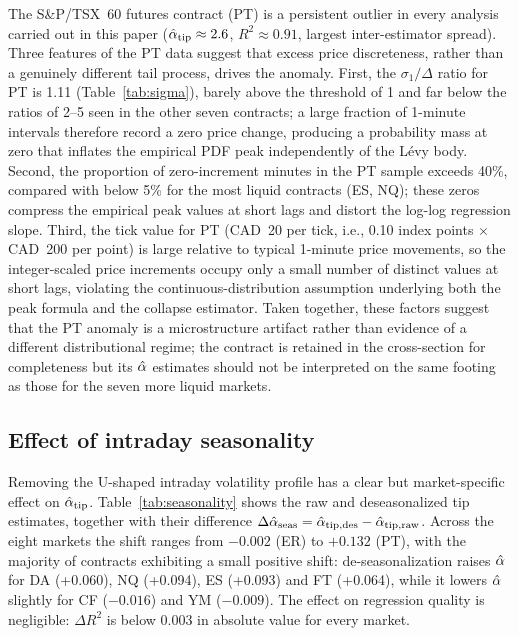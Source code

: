 \documentclass[12pt,a4paper]{article}
\begin{document}
The S\&P/TSX~60 futures contract (PT) is a persistent outlier in every
analysis carried out in this paper ($\hat{\alpha}_{\mathrm{tip}}\approx 2.6$,
$R^2\approx 0.91$, largest inter-estimator spread).
Three features of the PT data suggest that excess price discreteness, rather
than a genuinely different tail process, drives the anomaly.
First, the $\sigma_1/\Delta$ ratio for PT is 1.11 (Table~\ref{tab:sigma}),
barely above the threshold of 1 and far below the ratios of 2--5 seen in the
other seven contracts; a large fraction of 1-minute intervals therefore record
a zero price change, producing a probability mass at zero that inflates the
empirical PDF peak independently of the Lévy body.
Second, the proportion of zero-increment minutes in the PT sample exceeds 40\%,
compared with below 5\% for the most liquid contracts (ES, NQ); these zeros
compress the empirical peak values at short lags and distort the log-log
regression slope.
Third, the tick value for PT (CAD~20 per tick, i.e., 0.10 index points \(\times\) CAD~200 per point) is large relative to typical 1-minute price movements, so the integer-scaled price increments occupy only a small number of distinct values at short lags, violating the continuous-distribution assumption underlying both the peak formula and the collapse estimator.
Taken together, these factors suggest that the PT anomaly is a microstructure
artifact rather than evidence of a different distributional regime; the
contract is retained in the cross-section for completeness but its
$\hat{\alpha}$ estimates should not be interpreted on the same footing as those for
the seven more liquid markets.


\subsection{Effect of intraday seasonality}
\label{sec:results:seasonality}

Removing the U-shaped intraday volatility profile has a clear but market-specific
effect on $\hat{\alpha}_{\mathrm{tip}}$.
Table~\ref{tab:seasonality} shows the raw and deseasonalized tip estimates,
together with their difference $\Delta\hat{\alpha}_{\mathrm{seas}}
= \hat{\alpha}_{\mathrm{tip,des}} - \hat{\alpha}_{\mathrm{tip,raw}}$.
Across the eight markets the shift ranges from $-0.002$ (ER) to $+0.132$ (PT),
with the majority of contracts exhibiting a small positive shift: de-seasonalization
raises $\hat{\alpha}$ for DA (+0.060), NQ (+0.094), ES (+0.093) and FT (+0.064), while
it lowers $\hat{\alpha}$ slightly for CF ($-0.016$) and YM ($-0.009$).
The effect on regression quality is negligible: $\Delta R^2$ is below $0.003$ in
absolute value for every market.
\end{document}

